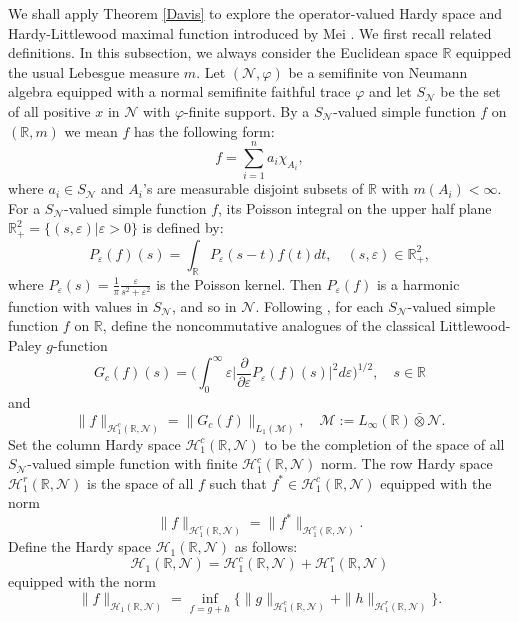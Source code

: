\documentclass[11]{amsart}
\numberwithin{equation}{section}
\newcommand{\R}{\mathbb{R}}
\begin{document}
We shall apply Theorem \ref{Davis} to explore the operator-valued Hardy space and Hardy-Littlewood maximal function introduced by Mei \cite{Me2007}.  We first recall related definitions. In this subsection, we always consider the Euclidean space $\mathbb{R}$ equipped the usual Lebesgue measure $m$. 
Let $(\mathcal{N},\varphi)$ be a semifinite von Neumann algebra equipped with a normal semifinite faithful trace $\varphi$ and let $S_{\mathcal{N}}$ be the set of all positive $x$ in $\mathcal{N}$ with $\varphi$-finite support.
By a $S_{\mathcal{N}}$-valued simple function $f$ on $(\mathbb{R}, m)$ we mean $f$ has the following form:
$$f =\sum_{i=1}^n a_i\chi_{A_i},$$
where $a_i\in S_{\mathcal{N}}$ and $A_i$'s are measurable disjoint subsets of $\R$ with $m(A_i) < \infty$. 
For a $S_{\mathcal{N}}$-valued simple function $f$,  its Poisson integral on the upper half plane $\mathbb R^2_
+ = \{(s, \varepsilon)|\varepsilon > 0\}$ is defined by:
$$ P_{\varepsilon}(f)(s)= \int_{\mathbb R}P_{\varepsilon}(s-t)f(t)dt, \quad (s,\varepsilon) \in \R^2_+,$$
where $P_{\varepsilon}(s)=\frac{1}{\pi}\frac{\varepsilon}{
	s^2+\varepsilon^2}$ is the Poisson kernel. Then $P_{\varepsilon}(f)$ is a
harmonic function with values in $S_{\mathcal{N}}$, and so in $\mathcal{N}$.
Following \cite[p.\,7-8]{Me2007}, for each $S_{\mathcal{N}}$-valued simple function $f$ on $\mathbb{R}$, define the noncommutative
analogues of the classical Littlewood-Paley $g$-function
\begin{equation*}
	G_c(f)(s)=\Big(\int_0^{\infty}\varepsilon\Big|\frac{\partial}{\partial \varepsilon}P_{\varepsilon}(f)(s)\Big|^2d\varepsilon\Big)^{1/2},\quad s\in \mathbb{R}
\end{equation*}
and 
$$\|f\|_{\mathcal{H}^c_1(\mathbb{R},\mathcal{N})}= \|G_c(f)\|_{L_1(\mathcal{M})},\quad \mathcal{M}:=L_{\infty}(\mathbb{R})\bar{\otimes}\mathcal{N}.$$
Set  the column Hardy space $\mathcal{H}^c_1(\mathbb{R},\mathcal{N})$ to be the completion of the space of all $S_{\mathcal{N}}$-valued simple function with finite $\mathcal{H}^c_1(\mathbb{R},\mathcal{N})$ norm. The row Hardy space $\mathcal{H}^r_1(\mathbb{R},\mathcal{N})$ is the space of all $f$ such that $f^*\in \mathcal{H}^c_1(\mathbb{R},\mathcal{N})$ 
equipped with the norm 
$$\|f\|_{\mathcal{H}^r_1(\mathbb{R},\mathcal{N})}=\|f^*\|_{\mathcal{H}^c_1(\mathbb{R},\mathcal{N})}.$$
Define the Hardy space $\mathcal{H}_1(\mathbb{R},\mathcal{N})$ as follows: 
$$\mathcal{H}_1(\mathbb{R},\mathcal{N})=\mathcal{H}_1^c(\mathbb{R},\mathcal{N})+\mathcal{H}_1^r(\mathbb{R},\mathcal{N})$$
equipped with the norm 
$$\|f\|_{\mathcal{H}_1(\mathbb{R},\mathcal{N})}=\inf_{f=g+h}\{\|g\|_{\mathcal{H}_1^c(\mathbb{R},\mathcal{N})}+\|h\|_{\mathcal{H}_1^r(\mathbb{R},\mathcal{N})}\}.$$
\end{document}
